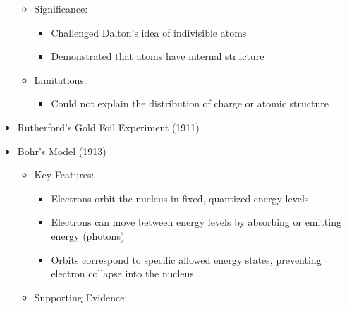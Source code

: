 \begin{itemize}
\begin{itemize}
\begin{itemize}
        \end{itemize}

      \item Significance:

        \begin{itemize}

          \item Challenged Dalton's idea of indivisible atoms

          \item Demonstrated that atoms have internal structure
            
        \end{itemize}

      \item Limitations:

        \begin{itemize}

          \item Could not explain the distribution of charge or atomic structure

        \end{itemize}

    \end{itemize}

  \item Rutherford's Gold Foil Experiment (1911)

  \item Bohr's Model (1913)

    \begin{itemize}

      \item Key Features:

        \begin{itemize}

          \item Electrons orbit the nucleus in fixed, quantized energy levels

          \item Electrons can move between energy levels by absorbing or emitting energy (photons)

          \item Orbits correspond to specific allowed energy states, preventing electron collapse into the nucleus

        \end{itemize}

      \item Supporting Evidence:

        \begin{itemize}


\end{itemize}
\end{itemize}
\end{itemize}
